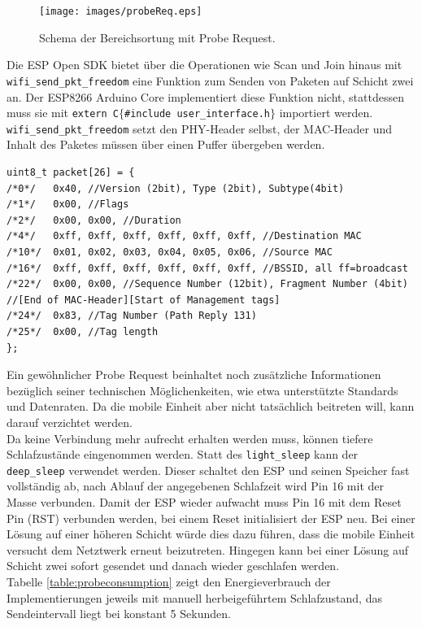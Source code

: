 \begin{figure}[h]
  \centering
	\texttt{[image: images/probeReq.eps]}
  \caption{Schema der Bereichsortung mit Probe Request.}
  \label{fig:probeReq}
\end{figure}


Die ESP Open SDK bietet über die Operationen wie Scan und Join hinaus mit \texttt{wifi\_send\_pkt\_freedom} eine Funktion zum Senden von Paketen auf Schicht zwei an.
Der ESP8266 Arduino Core implementiert diese Funktion nicht, stattdessen muss sie mit \texttt{extern \dq C\dq $\lbrace$\#include \dq user\_interface.h\dq $\rbrace$} importiert werden. \\
\texttt{wifi\_send\_pkt\_freedom} setzt den PHY-Header selbst, der MAC-Header und Inhalt des Paketes müssen über einen Puffer übergeben werden.
\begin{verbatim}
uint8_t packet[26] = { 
/*0*/ 	0x40, //Version (2bit), Type (2bit), Subtype(4bit)
/*1*/ 	0x00, //Flags 
/*2*/ 	0x00, 0x00, //Duration
/*4*/   0xff, 0xff, 0xff, 0xff, 0xff, 0xff, //Destination MAC
/*10*/  0x01, 0x02, 0x03, 0x04, 0x05, 0x06, //Source MAC
/*16*/  0xff, 0xff, 0xff, 0xff, 0xff, 0xff, //BSSID, all ff=broadcast
/*22*/  0x00, 0x00, //Sequence Number (12bit), Fragment Number (4bit) 
//[End of MAC-Header][Start of Management tags]
/*24*/  0x83, //Tag Number (Path Reply 131) 
/*25*/ 	0x00, //Tag length
}; 
\end{verbatim}
Ein gewöhnlicher Probe Request beinhaltet noch zusätzliche Informationen bezüglich seiner technischen Möglichenkeiten, wie etwa unterstützte Standards und Datenraten. 
Da die mobile Einheit aber nicht tatsächlich beitreten will, kann darauf verzichtet werden. \\
Da keine Verbindung mehr aufrecht erhalten werden muss, können tiefere Schlafzustände eingenommen werden. 
Statt des \texttt{light\_sleep} kann der \texttt{deep\_sleep} verwendet werden.
Dieser schaltet den ESP und seinen Speicher fast vollständig ab, nach Ablauf der angegebenen Schlafzeit wird Pin 16 mit der Masse verbunden.
Damit der ESP wieder aufwacht muss Pin 16 mit dem Reset Pin (RST) verbunden werden, bei einem Reset initialisiert der ESP neu.
Bei einer Lösung auf einer höheren Schicht würde dies dazu führen, dass die mobile Einheit versucht dem Netztwerk erneut beizutreten. 
Hingegen kann bei einer Lösung auf Schicht zwei sofort gesendet und danach wieder geschlafen werden.\\
Tabelle \ref{table:probeconsumption} zeigt den Energieverbrauch der Implementierungen jeweils mit manuell herbeigeführtem Schlafzustand, das Sendeintervall liegt bei konstant 5 Sekunden.
